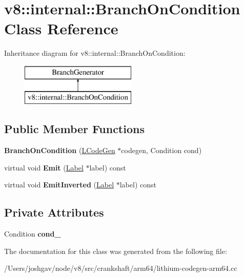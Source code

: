 \hypertarget{classv8_1_1internal_1_1_branch_on_condition}{}\section{v8\+:\+:internal\+:\+:Branch\+On\+Condition Class Reference}
\label{classv8_1_1internal_1_1_branch_on_condition}
Inheritance diagram for v8\+:\+:internal\+:\+:Branch\+On\+Condition\+:\begin{figure}[H]
\begin{center}
\leavevmode
\includegraphics[height=2.000000cm]{classv8_1_1internal_1_1_branch_on_condition}
\end{center}
\end{figure}
\subsection*{Public Member Functions}
\begin{DoxyCompactItemize}
\item 
{\bfseries Branch\+On\+Condition} (\hyperlink{classv8_1_1internal_1_1_l_code_gen}{L\+Code\+Gen} $\ast$codegen, Condition cond)\hypertarget{classv8_1_1internal_1_1_branch_on_condition_a39276c9e47d4e07c3b97c56c335e8e2c}{}\label{classv8_1_1internal_1_1_branch_on_condition_a39276c9e47d4e07c3b97c56c335e8e2c}

\item 
virtual void {\bfseries Emit} (\hyperlink{classv8_1_1internal_1_1_label}{Label} $\ast$label) const \hypertarget{classv8_1_1internal_1_1_branch_on_condition_af92fbc13da251b8894d547719ca72945}{}\label{classv8_1_1internal_1_1_branch_on_condition_af92fbc13da251b8894d547719ca72945}

\item 
virtual void {\bfseries Emit\+Inverted} (\hyperlink{classv8_1_1internal_1_1_label}{Label} $\ast$label) const \hypertarget{classv8_1_1internal_1_1_branch_on_condition_a432b2ec27cfe55c0edf2f285cfaec2ff}{}\label{classv8_1_1internal_1_1_branch_on_condition_a432b2ec27cfe55c0edf2f285cfaec2ff}

\end{DoxyCompactItemize}
\subsection*{Private Attributes}
\begin{DoxyCompactItemize}
\item 
Condition {\bfseries cond\+\_\+}\hypertarget{classv8_1_1internal_1_1_branch_on_condition_a5fac5731b990ca629dda671989df90fa}{}\label{classv8_1_1internal_1_1_branch_on_condition_a5fac5731b990ca629dda671989df90fa}

\end{DoxyCompactItemize}


The documentation for this class was generated from the following file\+:\begin{DoxyCompactItemize}
\item 
/\+Users/joshgav/node/v8/src/crankshaft/arm64/lithium-\/codegen-\/arm64.\+cc\end{DoxyCompactItemize}
